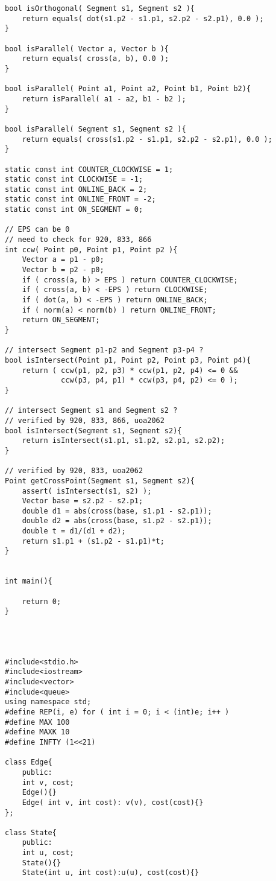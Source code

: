 \begin{verbatim}
bool isOrthogonal( Segment s1, Segment s2 ){
    return equals( dot(s1.p2 - s1.p1, s2.p2 - s2.p1), 0.0 );
}

bool isParallel( Vector a, Vector b ){
    return equals( cross(a, b), 0.0 );
}

bool isParallel( Point a1, Point a2, Point b1, Point b2){
    return isParallel( a1 - a2, b1 - b2 );
}

bool isParallel( Segment s1, Segment s2 ){
    return equals( cross(s1.p2 - s1.p1, s2.p2 - s2.p1), 0.0 );
}

static const int COUNTER_CLOCKWISE = 1;
static const int CLOCKWISE = -1;
static const int ONLINE_BACK = 2;
static const int ONLINE_FRONT = -2;
static const int ON_SEGMENT = 0;

// EPS can be 0
// need to check for 920, 833, 866
int ccw( Point p0, Point p1, Point p2 ){
    Vector a = p1 - p0;
    Vector b = p2 - p0;
    if ( cross(a, b) > EPS ) return COUNTER_CLOCKWISE;
    if ( cross(a, b) < -EPS ) return CLOCKWISE;
    if ( dot(a, b) < -EPS ) return ONLINE_BACK;
    if ( norm(a) < norm(b) ) return ONLINE_FRONT;
    return ON_SEGMENT;
}

// intersect Segment p1-p2 and Segment p3-p4 ?
bool isIntersect(Point p1, Point p2, Point p3, Point p4){
    return ( ccw(p1, p2, p3) * ccw(p1, p2, p4) <= 0 &&
             ccw(p3, p4, p1) * ccw(p3, p4, p2) <= 0 );
}

// intersect Segment s1 and Segment s2 ?
// verified by 920, 833, 866, uoa2062
bool isIntersect(Segment s1, Segment s2){
    return isIntersect(s1.p1, s1.p2, s2.p1, s2.p2);
}

// verified by 920, 833, uoa2062
Point getCrossPoint(Segment s1, Segment s2){
    assert( isIntersect(s1, s2) );
    Vector base = s2.p2 - s2.p1;
    double d1 = abs(cross(base, s1.p1 - s2.p1));
    double d2 = abs(cross(base, s1.p2 - s2.p1));
    double t = d1/(d1 + d2);
    return s1.p1 + (s1.p2 - s1.p1)*t;
}


int main(){

    return 0;
}




#include<stdio.h>
#include<iostream>
#include<vector>
#include<queue>
using namespace std;
#define REP(i, e) for ( int i = 0; i < (int)e; i++ )
#define MAX 100
#define MAXK 10
#define INFTY (1<<21)

class Edge{
    public:
    int v, cost;
    Edge(){}
    Edge( int v, int cost): v(v), cost(cost){}
};

class State{
    public:
    int u, cost;
    State(){}
    State(int u, int cost):u(u), cost(cost){}


\end{verbatim}
